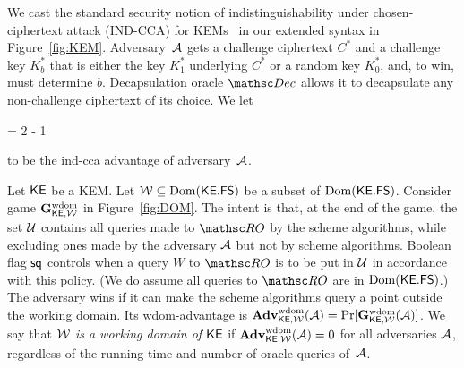 We cast the standard security notion of indistinguishability under chosen-ciphertext attack (IND-CCA) for KEMs~\cite{CraSho03} in our extended syntax in Figure~\ref{fig:KEM}.
Adversary~$\mathcal{A}$ gets a challenge ciphertext $C^*$ and a challenge key $K_b^*$ that is either the key $K_1^*$ underlying $C^*$ or a random key $K_0^*$, and, to win, must determine $b$. Decapsulation oracle $\DecO$ allows it to decapsulate any non-challenge ciphertext of its choice. We let
\begin{newmath}
	\indccaAdv{\kemScheme}{\advA} = 2 \Pr[\ngameINDCCA{\kemScheme}] - 1
\end{newmath}%
to be the ind-cca advantage of adversary~$\mathcal{A}$. 






 Let ${\mathsf{KE}}$ be a KEM. Let ${\cal W} \subseteq \mathrm{Dom}(\mathsf{\mathsf{{\mathsf{KE}}.FS}})$ be a subset of $\mathrm{Dom}(\mathsf{\mathsf{{\mathsf{KE}}.FS}})$. Consider game $\mathbf{G}^{\mathrm{wdom}}_{{\mathsf{KE}},{\cal W}}$ in Figure~\ref{fig:DOM}. The intent is that, at the end of the game, the set $\mathcal{U}$ contains all queries made to $\RO$ by the scheme algorithms, while excluding ones made by the adversary $\mathcal{A}$ but not by scheme algorithms. Boolean flag $\mathsf{sq}$ controls when a query $W$ to $\RO$ is to be put in $\mathcal{U}$ in accordance with this policy. (We do assume all queries to $\RO$ are in $\mathrm{Dom}(\mathsf{\mathsf{{\mathsf{KE}}.FS}})$.) The adversary wins if it can make the scheme algorithms query a point outside the working domain. Its wdom-advantage is $\mathbf{Adv}^{\mathrm{wdom}}_{{\mathsf{KE}},{\cal W}}(\mathcal{A}) \allowbreak = \allowbreak \Pr[\mathbf{G}^{\mathrm{wdom}}_{{\mathsf{KE}},{\cal W}}(\mathcal{A})]$. We say that \textit{${\cal W}$ is a working domain of ${\mathsf{KE}}$} if $\mathbf{Adv}^{\mathrm{wdom}}_{{\mathsf{KE}},{\cal W}}(\mathcal{A})=0$ for all adversaries $\mathcal{A}$, regardless of the running time and number of oracle queries of~$\mathcal{A}$. 

